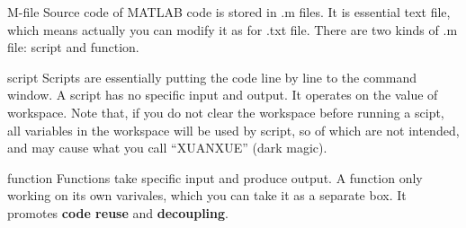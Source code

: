 \begin{frame}{M-file}
Source code of MATLAB code is stored in .m files. It is essential text file, which means actually you can modify it as for .txt file. There are two kinds of .m file: script and function.
\begin{block}{script}
Scripts are essentially putting the code line by line to the command window. A script has no specific input and output. It operates on the value of workspace. Note that, if you do not clear the workspace before running a scipt, all variables in the workspace will be used by script, so of which are not intended, and may cause what you call ``XUANXUE'' (dark magic). \footnotemark
\end{block}
\begin{block}{function}
Functions take specific input and produce output. A function only working on its own varivales, which you can take it as a separate box. It promotes \textbf{code reuse} and \textbf{decoupling}.
\end{block}
\end{frame}

